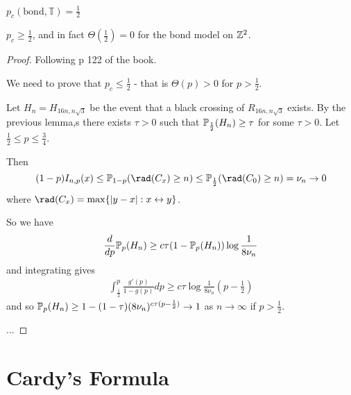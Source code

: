 
\begin{thm}
  \label{defn:random_walks_on_graphs:25}
  $p_{c}(\text{bond}, \mathbb{T}) = \frac{1}{2}$
\end{thm}

\begin{thm}
  \label{defn:random_walks_on_graphs:27}
  $p_{c} \geq \frac{1}{2}$, and in fact $\Theta(\frac{1}{2}) = 0$ for
  the bond model on $\mathbb{Z}^{2}$.
\end{thm}


\begin{proof}
  Following p 122 of the book.
  
  We need to prove that $p_{c} \leq \frac{1}{2}$ - that is $\Theta(p)
  > 0$ for $p > \frac{1}{2}$.


  Let $H_{n} = H_{16 n, n \sqrt{3}}$ be the event that a black
  crossing of $R_{16n, n \sqrt{3}}$ exists. By the previous lemma,s
  there exists $\tau > 0$ such that $\Prob_{\frac{1}{2}}(H_{n}) \geq
  \tau$ for some $\tau > 0$. Let $\frac{1}{2} \leq p \leq
  \frac{3}{4}$.

  Then
  \begin{equation}
    \label{eq:43}
    (1-p) I_{n, p}(x) \leq \Prob_{1-p}(\rad(C_{x}) \geq n) \leq
    \Prob_{\frac{1}{2}} (\rad(C_{0}) \geq n) = \nu_{n} \rightarrow 0
  \end{equation}
  where $\rad(C_{x}) = \max \{ |y-x| : x \leftrightarrow y \}$.

  So we have
  \begin{align}
    \label{eq:44}
    \frac{d}{dp} \Prob_{p}(H_{n}) \geq c \tau(1 - \Prob_{p}(H_{n}))
    \log \frac{1}{8 \nu_{n}}
  \end{align}
  and integrating gives
  \begin{align}
    \label{eq:45}
    \int_{\frac{1}{2}}^{p} \frac{g'(p)}{1-g(p)} dp \geq c \tau \log
    \frac{1}{8 \nu_{n}} (p - \frac{1}{2})
  \end{align}
  and so $\Prob_{p}(H_{n}) \geq 1 - (1-\tau)(8 \nu_{n})^{c \tau(p -
    \frac{1}{2})} \rightarrow 1$ as $n \rightarrow \infty$ if $p >
  \frac{1}{2}$.

  ... 
\end{proof}

\section{Cardy's Formula}
\label{sec:cardys-formula}

